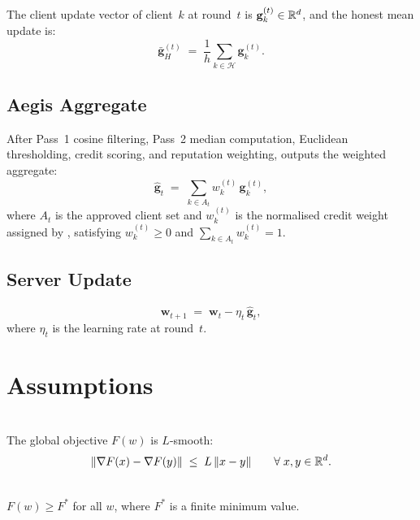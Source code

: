 \documentclass[../main]{subfiles}
\begin{document}
The client update vector of client~$k$ at round~$t$ is $\mathbf{g}_k^{(t)} \in \mathbb{R}^d$,
and the honest mean update is:
\begin{equation}
    \bar{\mathbf{g}}_H^{(t)} \;=\; \frac{1}{h} \sum_{k \in \mathcal{H}} \mathbf{g}_k^{(t)}.
    \label{eq:honest_mean}
\end{equation}
\subsection{Aegis Aggregate}

After Pass~1 cosine filtering, Pass~2 median computation,
Euclidean thresholding, credit scoring, and reputation weighting,
\aegis{} outputs the weighted aggregate:
\begin{equation}
    \hat{\mathbf{g}}_t \;=\; \sum_{k \in A_t} w_k^{(t)}\, \mathbf{g}_k^{(t)},
    \label{eq:aegis_agg}
\end{equation}
where $A_t$ is the approved client set and $w_k^{(t)}$ is the normalised
credit weight assigned by \aegis{}, satisfying $w_k^{(t)} \geq 0$ and
$\sum_{k \in A_t} w_k^{(t)} = 1$.

\subsection{Server Update}
\begin{equation}
    \mathbf{w}_{t+1} \;=\; \mathbf{w}_t - \eta_t\, \hat{\mathbf{g}}_t,
    \label{eq:server_update}
\end{equation}
where $\eta_t$ is the learning rate at round~$t$.

\section{Assumptions}
\label{app:assumptions}

\begin{assumption}
\hfill \\\label{asm:A1}
The global objective $F(w)$ is $L$-smooth:
\[
    \|\nabla F(x) - \nabla F(y)\| \;\leq\; L\,\|x - y\|
    \qquad \forall\; x, y \in \mathbb{R}^d.
\]
\end{assumption}

\begin{assumption}
\hfill \\\label{asm:A2}
$F(w) \geq F^*$ for all $w$, where $F^*$ is a finite minimum value.
\end{assumption}
\end{document}
